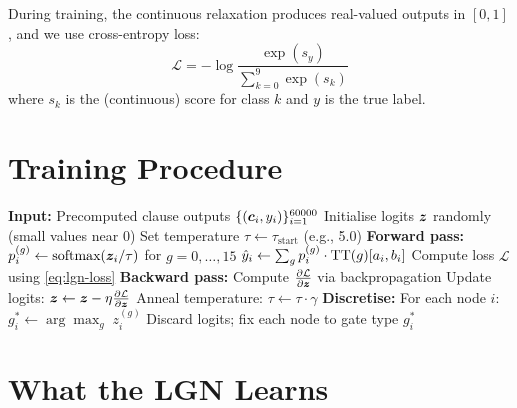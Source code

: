 During training, the continuous relaxation produces real-valued
outputs in $[0, 1]$, and we use cross-entropy loss:
\begin{equation}
  \mathcal{L} = -\log \frac
    {\exp(s_y)}
    {\sum_{k=0}^{9} \exp(s_k)}
  \label{eq:lgn-loss}
\end{equation}
where $s_k$ is the (continuous) score for class $k$ and $y$ is the
true label.


\section{Training Procedure}
\label{sec:lgn-procedure}

\begin{algorithm}[htbp]
\caption{Training the Logic Gate Network (Phase~2).}
\label{alg:lgn-train}
\begin{algorithmic}[1]
  \State \textbf{Input:} Precomputed clause outputs $\{(\bm{c}_i, y_i)\}_{i=1}^{60000}$
  \State Initialise logits $\bm{z}$ randomly (small values near 0)
  \State Set temperature $\tau \leftarrow \tau_{\text{start}}$ (e.g., 5.0)
      \State \textbf{Forward pass:}
        \State $p_i^{(g)} \leftarrow \text{softmax}(\bm{z}_i / \tau)$
          for $g = 0, \ldots, 15$
        \State $\hat{y}_i \leftarrow \sum_g p_i^{(g)} \cdot
          \operatorname{TT}(g)[a_i, b_i]$
      \EndFor
      \State Compute loss $\mathcal{L}$ using \cref{eq:lgn-loss}
      \Statex
      \State \textbf{Backward pass:}
      \State Compute $\frac{\partial \mathcal{L}}{\partial \bm{z}}$
        via backpropagation
      \State Update logits: $\bm{z} \leftarrow \bm{z} -
        \eta \frac{\partial \mathcal{L}}{\partial \bm{z}}$
    \EndFor
    \State Anneal temperature: $\tau \leftarrow \tau \cdot \gamma$
  \EndFor
  \Statex
  \State \textbf{Discretise:}
  \State For each node $i$: $g_i^* \leftarrow \arg\max_g \; z_i^{(g)}$
  \State Discard logits; fix each node to gate type $g_i^*$
\end{algorithmic}
\end{algorithm}


\section{What the LGN Learns}
\label{sec:lgn-learns}

